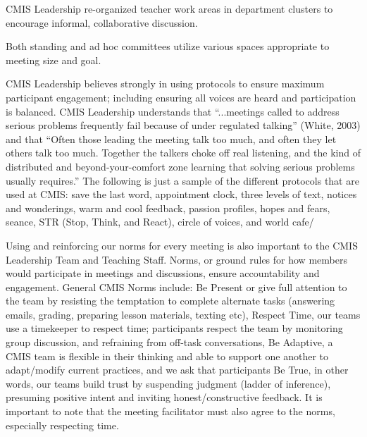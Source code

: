 \begin{findings}

CMIS Leadership re-organized teacher work areas in department clusters to encourage informal, collaborative  discussion. 

Both standing and ad hoc committees utilize various spaces appropriate to meeting size and goal.

 
CMIS Leadership believes strongly in using protocols to ensure maximum participant engagement; including ensuring all voices are heard and participation is balanced. CMIS Leadership understands that “...meetings called to address serious problems frequently fail because of under regulated talking” (White, 2003)  and that “Often those leading the meeting talk too much, and often they let others talk too much. Together the talkers choke off real listening, and the kind of distributed and beyond-your-comfort zone learning that solving serious problems usually requires.” The following is just a sample of the different protocols that are used at CMIS: save the last word, appointment clock, three levels of text, notices and wonderings, warm and cool feedback, passion profiles, hopes and fears, seance, STR (Stop, Think, and React), circle of voices, and world cafe/   

Using and reinforcing our norms for every meeting is also important to the CMIS Leadership Team and Teaching Staff. Norms, or ground rules for how members would participate in meetings and discussions, ensure accountability and engagement. General CMIS Norms include: Be Present or give full attention to  the team by resisting the temptation to complete alternate tasks (answering emails, grading, preparing lesson materials, texting etc), Respect Time, our teams use a timekeeper to respect time; participants respect the team by monitoring group discussion, and refraining from off-task conversations, Be Adaptive, a CMIS team is flexible in their thinking and able to support one another to adapt/modify current practices, and we ask that participants Be True, in other words, our teams build trust by suspending judgment (ladder of inference), presuming positive intent and inviting  honest/constructive feedback. It is important to note that the meeting facilitator must also agree to the norms, especially respecting time. 


\end{findings}

